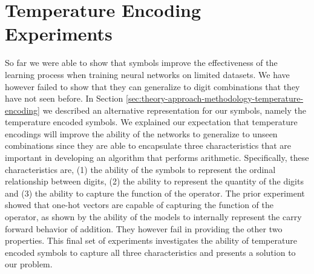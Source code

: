 \section{Temperature Encoding Experiments} \label{sec:empirical-studies-temperature-encoding-experiments}

So far we were able to show that symbols improve the effectiveness of the learning process when training neural networks on limited datasets. We have however failed to show that they can generalize to digit combinations that they have not seen before. In Section \ref{sec:theory-approach-methodology-temperature-encoding} we described an alternative representation for our symbols, namely the temperature encoded symbols. We explained our expectation that temperature encodings will improve the ability of the networks to generalize to unseen combinations since they are able to encapsulate three characteristics that are important in developing an algorithm that performs arithmetic. Specifically, these characteristics are, (1) the ability of the symbols to represent the ordinal relationship between digits, (2) the ability to represent the quantity of the digits and (3) the ability to capture the function of the operator. The prior experiment showed that one-hot vectors are capable of capturing the function of the operator, as shown by the ability of the models to internally represent the carry forward behavior of addition. They however fail in providing the other two properties. This final set of experiments investigates the ability of temperature encoded symbols to capture all three characteristics and presents a solution to our problem. 



